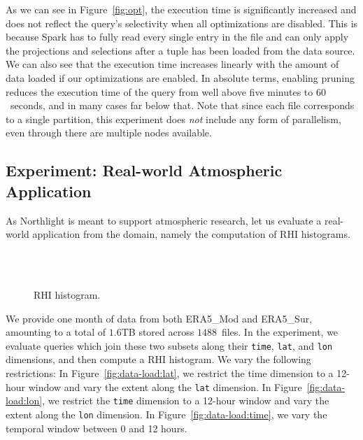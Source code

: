 \documentclass[conference]{IEEEtran}
\newcommand{\system}{Northlight}
\newcommand{\smalltt}[1]{{\texttt{\small #1}}}
\begin{document}
As we can see in Figure~\ref{fig:opt}, the execution time is significantly increased and does not reflect the query's selectivity when all optimizations are disabled.
This is because Spark has to fully read every single entry in the file and can only apply the projections and selections after a tuple has been loaded from the data source.
We can also see that the execution time increases linearly with the amount of data loaded if our optimizations are enabled.
In absolute terms, enabling pruning reduces the execution time of the query from well above five minutes to $60$~seconds, and in many cases far below that.
Note that since each file corresponds to a single partition, this experiment does \textit{not} include any form of parallelism, even through there are multiple nodes available.

\subsection{Experiment: Real-world Atmospheric Application}

As \system{} is meant to support atmospheric research, let us evaluate a real-world application from the domain, namely the computation of RHI histograms. 
\begin{wrapfigure}{r}{0.475\columnwidth}
\vspace*{-0.8cm}
\\ \vspace*{-0.5cm}
\\ \vspace*{-0.5cm}
\caption{RHI histogram.}
\vspace*{-0.2cm}
\label{fig:data-load}
\end{wrapfigure}
We provide one month of data from both ERA5\_Mod and ERA5\_Sur, amounting to a total of $1.6$TB stored across $1488$~files. 
In the experiment, we evaluate queries which join these two subsets along their \smalltt{time}, \smalltt{lat}, and \smalltt{lon} dimensions, and then compute a RHI histogram. We vary the following restrictions: 
In Figure~\ref{fig:data-load:lat}, we restrict the time dimension to a 12-hour window and vary the extent along the \smalltt{lat} dimension. In Figure~\ref{fig:data-load:lon}, we restrict the \smalltt{time} dimension to a 12-hour window and vary the extent along the \smalltt{lon} dimension. In Figure~\ref{fig:data-load:time}, we vary the temporal window between 0 and 12 hours.
\end{document}
